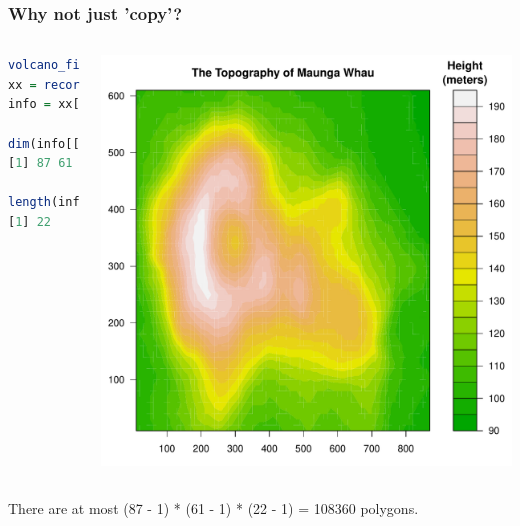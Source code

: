 \documentclass{beamer}
\begin{document}



\begin{frame}[fragile]
\frametitle{Why not just 'copy'?}

\begin{columns}[c]
\begin{lstlisting}[language = R]
volcano_filled.contour()
xx = recordPlot()
info = xx[[1]][[12]][[2]]

dim(info[[4]])
[1] 87 61

length(info[[5]])
[1] 22
 
\end{lstlisting}
\begin{center}
\includegraphics{plot/filled_example_1}
\end{center}

\end{columns}
There are at most (87 - 1) * (61 - 1) * (22 - 1) =  108360 polygons.


\end{frame}


\end{document}
